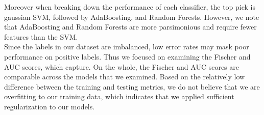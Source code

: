 \documentclass[twoside,twocolumn,paper=letter,fontsize=11pt]{article}
\begin{document}
Moreover when breaking down the performance of each classifier, the top pick is
gaussian SVM, followed by AdaBoosting, and Random Forests. However, we note
that AdaBoosting and Random Forests are more parsimonious and require fewer
features than the SVM. 
\\

Since the labels in our dataset are imbalanced, low error rates may mask poor
performance on positive labels. Thus we focused on examining the Fischer and AUC
scores, which capture. On the whole, the Fischer and AUC scores are comparable
across the models that we examined. Based on the relatively low difference
between the training and testing metrics, we do not believe that we are
overfitting to our training data, which indicates that we applied sufficient
regularization to our models.
\\
\end{document}
